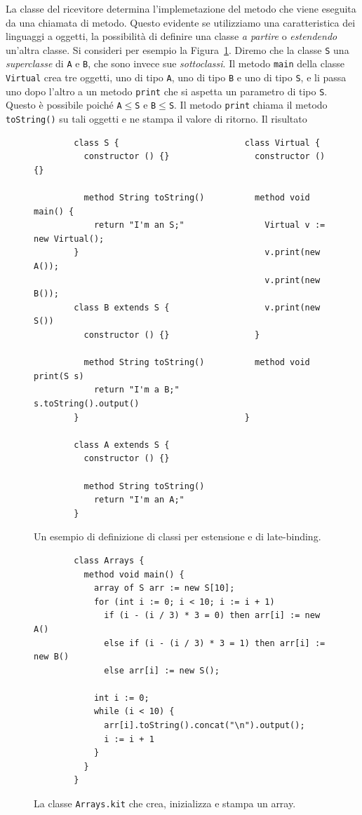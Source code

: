 La classe del ricevitore determina l'implemetazione del metodo che viene
eseguita da una chiamata di metodo. Questo \e evidente se utilizziamo una
caratteristica dei linguaggi a oggetti, \cioe la possibilit\`a di definire
una classe \emph{a partire} o \emph{estendendo} un'altra classe. Si consideri
per esempio la Figura~\ref{fig:extension}.
Diremo che la classe \texttt{S} \e una \emph{superclasse} di \texttt{A}
e \texttt{B}, che sono invece sue \emph{sottoclassi}. Il metodo
\texttt{main} della classe \texttt{Virtual} crea tre oggetti,
uno di tipo \texttt{A}, uno di tipo \texttt{B} e uno di tipo
\texttt{S}, e li passa uno dopo l'altro a un metodo \texttt{print}
che si aspetta un parametro di tipo \texttt{S}. Questo
\`e possibile poich\'e \texttt{A}$\le$\texttt{S} e \texttt{B}$\le$\texttt{S}.
Il metodo \texttt{print} chiama il metodo \texttt{toString()} su tali oggetti
e ne stampa il valore di ritorno. Il risultato \e
%
\begin{figure}[t]
\begin{verbatim}
        class S {                         class Virtual {
          constructor () {}                 constructor () {}
                                            
          method String toString()          method void main() {
            return "I'm an S;"                Virtual v := new Virtual();
        }                                     v.print(new A());
                                              v.print(new B());
        class B extends S {                   v.print(new S())
          constructor () {}                 }
                                            
          method String toString()          method void print(S s)
            return "I'm a B;"                s.toString().output()
        }                                 }

        class A extends S {
          constructor () {}

          method String toString()
            return "I'm an A;"
        }
\end{verbatim}
\caption{Un esempio di definizione di classi per estensione e di late-binding.}
  \label{fig:extension}
\end{figure}
%
\begin{figure}[t]
\begin{verbatim}
        class Arrays {
          method void main() {
            array of S arr := new S[10];
            for (int i := 0; i < 10; i := i + 1)
              if (i - (i / 3) * 3 = 0) then arr[i] := new A()
              else if (i - (i / 3) * 3 = 1) then arr[i] := new B()
              else arr[i] := new S();

            int i := 0;
            while (i < 10) {
              arr[i].toString().concat("\n").output();
              i := i + 1
            }
          }
        }
\end{verbatim}
\caption{La classe \texttt{Arrays.kit} che crea, inizializza e
stampa un array.}\label{fig:array}
\end{figure}
